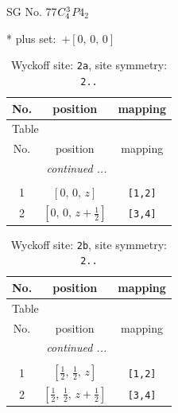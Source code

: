 \documentclass[fleqn,8pt]{jsarticle}
\begin{document}
\setcounter{MaxMatrixCols}{32}

\renewcommand{\tablename}{Table~}
\renewcommand{\figurename}{Figure~}
\begin{center}
\LARGE
SG No. 77\quad$C_{\rm 4}^{3}$\quad$P4_2$\quad[ tetragonal ]
\end{center}
* plus set:\,\,\,$+\left[ 0,\, 0,\, 0 \right]$
\renewcommand{\arraystretch}{1.2}
\begin{longtable}{ccc}
\caption{Wyckoff site: {\tt 2a}, site symmetry: {\tt 2..}}
 \\
 \hline \hline
No. & position & mapping \\ \hline \endfirsthead

\multicolumn{2}{l}{\tablename\ \thetable{}} \\
 \hline \hline
No. & position & mapping \\ \hline \endhead

 \hline \hline
\multicolumn{2}{r}{\footnotesize\it continued ...} \\ \endfoot

 \hline \hline
\multicolumn{2}{r}{} \\ \endlastfoot

1 & $\left[ 0,\, 0,\, z \right]$ & {\tt [1,2]} \\ \hline
2 & $\left[ 0,\, 0,\, z + \frac{1}{2} \right]$ & {\tt [3,4]} \\
\end{longtable}
\renewcommand{\arraystretch}{1.2}
\begin{longtable}{ccc}
\caption{Wyckoff site: {\tt 2b}, site symmetry: {\tt 2..}}
 \\
 \hline \hline
No. & position & mapping \\ \hline \endfirsthead

\multicolumn{2}{l}{\tablename\ \thetable{}} \\
 \hline \hline
No. & position & mapping \\ \hline \endhead

 \hline \hline
\multicolumn{2}{r}{\footnotesize\it continued ...} \\ \endfoot

 \hline \hline
\multicolumn{2}{r}{} \\ \endlastfoot

1 & $\left[ \frac{1}{2},\, \frac{1}{2},\, z \right]$ & {\tt [1,2]} \\ \hline
2 & $\left[ \frac{1}{2},\, \frac{1}{2},\, z + \frac{1}{2} \right]$ & {\tt [3,4]} \\
\end{longtable}
\end{document}
